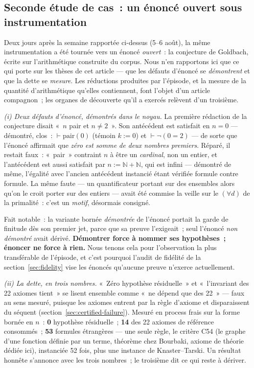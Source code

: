 \documentclass[11pt]{article}
\theoremstyle{remark}\newtheorem{example}{Exemple}
\begin{document}
\subsection{Seconde étude de cas~: un énoncé ouvert sous instrumentation}
\label{sec:goldbach}

Deux jours après la semaine rapportée ci-dessus (5--6 août), la même instrumentation a
été tournée vers un énoncé \emph{ouvert}~: la conjecture de Goldbach, écrite sur
l'arithmétique construite du corpus. Nous n'en rapportons ici que ce qui porte sur les
thèses de cet article --- que les défauts d'énoncé se \emph{démontrent} et que la dette
se \emph{mesure}. Les réductions produites par l'épisode, et la mesure de la quantité
d'arithmétique qu'elles contiennent, font l'objet d'un article compagnon~; les organes
de découverte qu'il a exercés relèvent d'un troisième.

\emph{(i) Deux défauts d'énoncé, démontrés dans le noyau.} La première rédaction de la
conjecture disait «~$n$ pair et $n \neq 2$~». Son antécédent est satisfait en $n = 0$ ---
démontré, clos~: $\vdash \mathrm{pair}(0)$ (témoin $k := 0$) et $\vdash \neg(0 = 2)$ ---
de sorte que l'énoncé affirmait que \emph{zéro est somme de deux nombres premiers}.
Réparé, il restait faux~: «~pair~» contraint $n$ à être un \emph{cardinal}, non un
entier, et l'antécédent est aussi satisfait par $n := \mathbb{N} + \mathbb{N}$, qui est
infini --- démontré de même, l'égalité avec l'ancien antécédent instancié étant
vérifiée formule contre formule. La même faute --- un quantificateur portant sur des
ensembles alors qu'on le croit porter sur des entiers --- avait été commise la veille sur
le $(\forall d)$ de la primalité~: c'est un \emph{motif}, désormais consigné.

Fait notable~: la variante bornée \emph{démontrée} de l'énoncé portait la garde de
finitude dès son premier jet, parce que sa preuve l'exigeait~; seul l'énoncé \emph{non
démontré} avait dérivé. \textbf{Démontrer force à nommer ses hypothèses~; énoncer ne
force à rien.} Nous tenons cela pour l'observation la plus transférable de l'épisode, et
c'est pourquoi l'audit de fidélité de la section~\ref{sec:fidelity} vise les énoncés
qu'aucune preuve n'exerce actuellement.

\emph{(ii) La dette, en trois nombres.} «~Zéro hypothèse résiduelle~» et «~l'invariant
des 22 axiomes tient~» se lisent ensemble comme «~ne dépend que des 22~» --- faux au sens
mesuré, puisque les axiomes entrent par la règle d'$\mathrm{axiome}$ et disparaissent du
séquent (section~\ref{sec:certified-failure}). Mesuré en process frais sur la forme
bornée en $n$~: \textbf{0} hypothèse résiduelle~; \textbf{14} des 22 axiomes de
référence consommés~; \textbf{53} formules étrangères --- une seule règle, le critère C54
(le graphe d'une fonction définie par un terme, théorème chez Bourbaki, axiome de
théorie dédiée ici), instanciée 52 fois, plus une instance de Knaster--Tarski. Un
résultat honnête s'annonce avec les trois nombres~; le troisième dit ce qui reste à
dériver.
\end{document}
